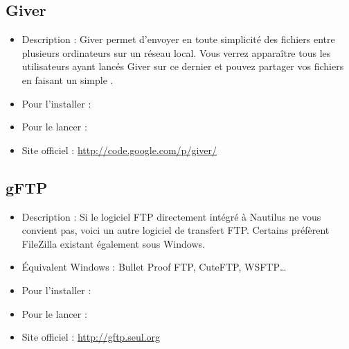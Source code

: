 \subsection{Giver}
\begin{itemize}
\begingroup
{}
\item Description : Giver permet d'envoyer en toute simplicité des fichiers entre plusieurs ordinateurs sur un réseau local. Vous verrez apparaître tous les utilisateurs ayant lancés Giver sur ce dernier et pouvez partager vos fichiers en faisant un simple .{\par}
\item Pour l'installer : 
\item Pour le lancer : 
\item Site officiel : \url{http://code.google.com/p/giver/}{\par}
\endgroup
\end{itemize}

\subsection{gFTP}
\begin{itemize}
\begingroup
{}
\item Description : Si le logiciel FTP directement intégré à Nautilus ne vous convient pas, voici un autre logiciel de transfert FTP. Certains préfèrent FileZilla existant également sous Windows.{\par}
\item Équivalent Windows : Bullet Proof FTP, CuteFTP, WSFTP\ldots{}{\par}
\item Pour l'installer : 
\item Pour le lancer : 
\item Site officiel : \url{http://gftp.seul.org}{\par}
\endgroup
\end{itemize}

